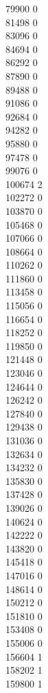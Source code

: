 { 79900	0 \\
 81498	0 \\
 83096	0 \\
 84694	0 \\
 86292	0 \\
 87890	0 \\
 89488	0 \\
 91086	0 \\
 92684	0 \\
 94282	0 \\
 95880	0 \\
 97478	0 \\
 99076	0 \\
 100674	2 \\
 102272	0 \\
 103870	0 \\
 105468	0 \\
 107066	0 \\
 108664	0 \\
 110262	0 \\
 111860	0 \\
 113458	0 \\
 115056	0 \\
 116654	0 \\
 118252	0 \\
 119850	0 \\
 121448	0 \\
 123046	0 \\
 124644	0 \\
 126242	0 \\
 127840	0 \\
 129438	0 \\
 131036	0 \\
 132634	0 \\
 134232	0 \\
 135830	0 \\
 137428	0 \\
 139026	0 \\
 140624	0 \\
 142222	0 \\
 143820	0 \\
 145418	0 \\
 147016	0 \\
 148614	0 \\
 150212	0 \\
 151810	0 \\
 153408	0 \\
 155006	0 \\
 156604	1 \\
 158202	1 \\
 159800	1 \\
}
